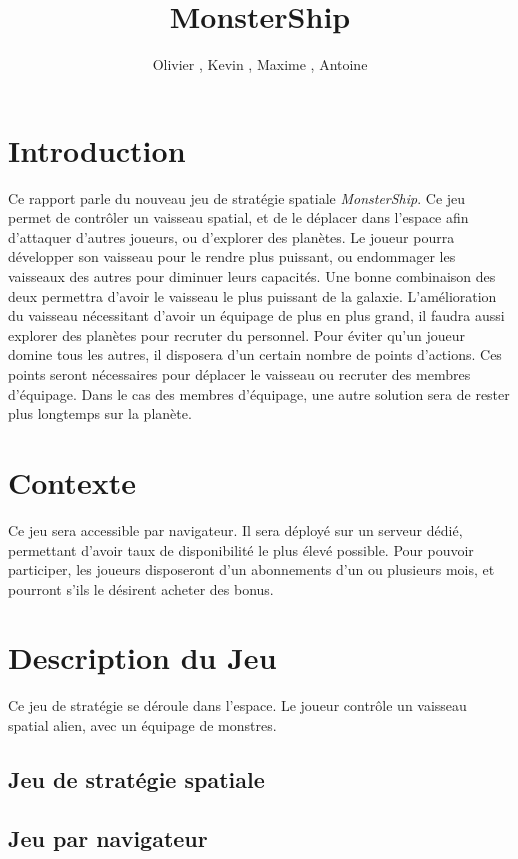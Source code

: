 \documentclass[a4paper,11pt]{report}
\title{MonsterShip}
\author{Olivier \bsc{Boissard}, Kevin \bsc{Boulala}, Maxime \bsc{Dubois}, Antoine \bsc{Lavier}}
\begin{document}
\maketitle
\setcounter{tocdepth}{1}
\tableofcontents

\chapter{Introduction}
  Ce rapport parle du nouveau jeu de stratégie spatiale \textit{MonsterShip}. 
  Ce jeu permet de contrôler un vaisseau spatial, et de le déplacer dans l'espace afin d'attaquer d'autres joueurs, ou d'explorer des planètes.
  Le joueur pourra développer son vaisseau pour le rendre plus puissant, ou endommager les vaisseaux des autres pour diminuer leurs capacités.
  Une bonne combinaison des deux permettra d'avoir le vaisseau le plus puissant de la galaxie. 
  L'amélioration du vaisseau nécessitant d'avoir un équipage de plus en plus grand, il faudra aussi explorer des planètes pour recruter du personnel.
  Pour éviter qu'un joueur domine tous les autres, il disposera d'un certain nombre de points d'actions. 
  Ces points seront nécessaires pour déplacer le vaisseau ou recruter des membres d'équipage. 
  Dans le cas des membres d'équipage, une autre solution sera de rester plus longtemps sur la planète.

\chapter{Contexte}
  Ce jeu sera accessible par navigateur. Il sera déployé sur un serveur dédié, permettant d'avoir taux de disponibilité le plus élevé possible.
  Pour pouvoir participer, les joueurs disposeront d'un abonnements d'un ou plusieurs mois, et pourront s'ils le désirent acheter des bonus.
  

\chapter{Description du Jeu}
  Ce jeu de stratégie se déroule dans l'espace. Le joueur contrôle un vaisseau spatial alien, avec un équipage de monstres. 
  
  
  \section{Jeu de stratégie spatiale}
  \section{Jeu par navigateur}
\end{document}
